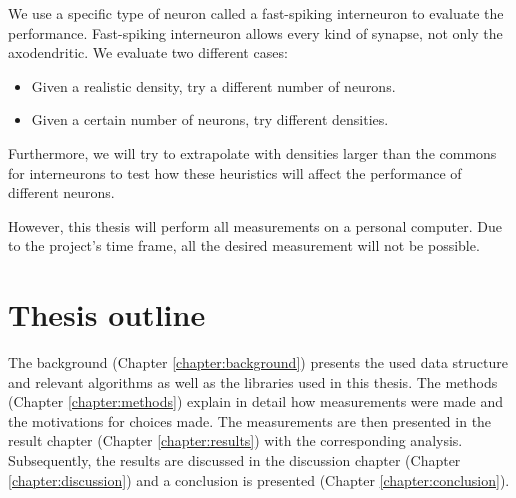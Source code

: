We use a specific type of neuron called a fast-spiking interneuron to evaluate the performance. Fast-spiking interneuron allows every kind of synapse, not only the axodendritic. We evaluate two different cases: 
\begin{itemize}
    \item Given a realistic density, try a different number of neurons.
    \item Given a certain number of neurons, try different densities. 
\end{itemize}
Furthermore, we will try to extrapolate with densities larger than the commons for interneurons to test how these heuristics will affect the performance of different neurons.

However, this thesis will perform all measurements on a personal computer. Due to the project's time frame, all the desired measurement will not be possible.

\section{Thesis outline}
The background (Chapter \ref{chapter:background}) presents the used data structure and relevant algorithms as well as the libraries used in this thesis. The methods (Chapter \ref{chapter:methods}) explain in detail how measurements were made and the motivations for choices made. The measurements are then presented in the result chapter (Chapter \ref{chapter:results}) with the corresponding analysis. Subsequently, the results are discussed in the discussion chapter (Chapter \ref{chapter:discussion}) and a conclusion is presented  (Chapter \ref{chapter:conclusion}).
